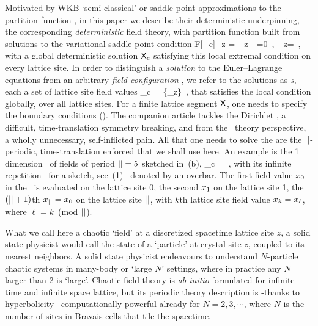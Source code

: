 Motivated by WKB `semi-classical' or saddle-point
approximations to the partition function ,
in this paper we describe their deterministic underpinning, the corresponding
\emph{deterministic} field theory, with partition function built from
solutions to the variational saddle-point condition
\beq
F[\Xx_c]_z =
\action[\Xx_c]_z -  =0
\,,\qquad
\action[\Xx]_z=
\,,
with a global deterministic solution $\mathsf{X}_c$ satisfying this local extremal
condition on every lattice site.
In order to distinguish a \emph{solution} to the Euler–Lagrange equations
 from an {arbitrary} \emph{field configuration}
, we refer to the solutions as
\emph{{\lattstate}s}, each a set of lattice site field values
\beq
\Xx_c = \{\ssp_z\}
\,,
\label{1dLattStat}
\eeq
that satisfies the local {condition}  globally,
over all lattice sites.
For a finite lattice segment $\mathsf{X}$, one needs to specify the boundary
conditions ({\bcs}).
The companion article  tackles the Dirichlet {\bcs}, a
difficult, time-translation symmetry breaking, and from the \po\ theory
perspective, a wholly unnecessary, self-inflicted pain. All that one
needs to solve the {\templatt} are the ${||}$-periodic,
time-translation enforced {\bcs} that we shall use here.
An example is the 1 {\spt} dimension \brick\ of fields of period
${||}=5$ sketched in \,(b),
\beq
\Xx_c = 
\,,
with its infinite repetition --for a sketch, see
\,(1)-- denoted by an overbar.
The first field value $x_0$ in the \brick\ is evaluated on the lattice site 0,
the second $x_1$ on the lattice site 1,
the $({||}+1)$th $x_{{||}}=x_0$ on the lattice site ${||}$,
with $k$th lattice site field value $x_{k}=x_{\ell}$,
where $\ell=k$~(mod ${||}$).

What we call here a chaotic `field' at a discretized spacetime lattice
site $z$, a solid state physicist would call the state of a `particle' at
crystal site $z$, coupled to its nearest neighbors. A solid state
physicist endeavours to understand $N$-particle chaotic systems in
many-body or `large $N$' settings, where in practice any $N$ larger than 2
is `large'. Chaotic field theory is {\em ab initio} formulated for infinite
time and infinite space lattice, but its periodic theory description is
-thanks to hyperbolicity-- computationally powerful already for $N=2, 3,
\cdots$, where $N$ is the number of sites in Bravais cells that tile the
spacetime.

